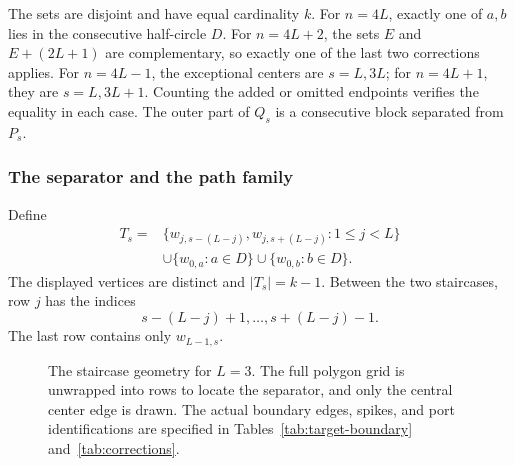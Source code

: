 \documentclass[11pt]{article}
\theoremstyle{definition}
\begin{document}
The sets are disjoint and have equal cardinality $k$. For $n=4L$,
exactly one of $a,b$ lies in the consecutive half-circle $D$.
For $n=4L+2$, the sets $E$ and $E+(2L+1)$ are complementary,
so exactly one of the last two corrections applies. For $n=4L-1$,
the exceptional centers are $s=L,3L$; for $n=4L+1$, they are
$s=L,3L+1$. Counting the added or omitted endpoints verifies
the equality in each case. The outer part of $Q_s$ is a consecutive
block separated from $P_s$.

\subsubsection{The separator and the path family}

Define
\begin{equation}
\begin{split}
 T_s={}&\{w_{j,s-(L-j)},w_{j,s+(L-j)}:1\le j<L\}\\
 &\cup\{w_{0,a}:a\in D\}\cup\{w_{0,b}:b\in D\}.
\end{split}
\label{eq:staircase-cut}
\end{equation}
The displayed vertices are distinct and $|T_s|=k-1$.
Between the two staircases, row $j$ has the indices
\begin{equation}
 s-(L-j)+1,\ldots,s+(L-j)-1.
 \label{eq:wedge-interior}
\end{equation}
The last row contains only $w_{L-1,s}$.

\begin{figure}[htbp]
\centering
{}
\caption{The staircase geometry for $L=3$. The full polygon grid
is unwrapped into rows to locate the separator, and only the central
center edge is drawn. The actual boundary edges, spikes, and port
identifications are specified in Tables~\ref{tab:target-boundary}
and~\ref{tab:corrections}.}
\label{fig:staircase}
\end{figure}
\end{document}
